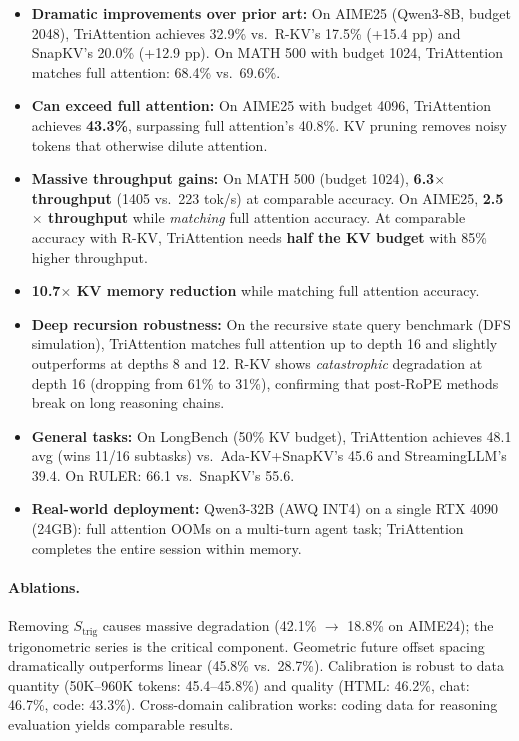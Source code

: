 \documentclass[11pt]{article}
\begin{document}
\begin{itemize}
    \item \textbf{Dramatic improvements over prior art:} On AIME25 (Qwen3-8B, budget 2048), TriAttention achieves 32.9\% vs.\ R-KV's 17.5\% (+15.4 pp) and SnapKV's 20.0\% (+12.9 pp). On MATH 500 with budget 1024, TriAttention matches full attention: 68.4\% vs.\ 69.6\%.

    \item \textbf{Can exceed full attention:} On AIME25 with budget 4096, TriAttention achieves \textbf{43.3\%}, surpassing full attention's 40.8\%. KV pruning removes noisy tokens that otherwise dilute attention.

    \item \textbf{Massive throughput gains:} On MATH 500 (budget 1024), \textbf{6.3$\times$ throughput} (1405 vs.\ 223 tok/s) at comparable accuracy. On AIME25, \textbf{2.5$\times$ throughput} while \textit{matching} full attention accuracy. At comparable accuracy with R-KV, TriAttention needs \textbf{half the KV budget} with 85\% higher throughput.

    \item \textbf{10.7$\times$ KV memory reduction} while matching full attention accuracy.

    \item \textbf{Deep recursion robustness:} On the recursive state query benchmark (DFS simulation), TriAttention matches full attention up to depth 16 and slightly outperforms at depths 8 and 12. R-KV shows \textit{catastrophic} degradation at depth 16 (dropping from 61\% to 31\%), confirming that post-RoPE methods break on long reasoning chains.

    \item \textbf{General tasks:} On LongBench (50\% KV budget), TriAttention achieves 48.1 avg (wins 11/16 subtasks) vs.\ Ada-KV+SnapKV's 45.6 and StreamingLLM's 39.4. On RULER: 66.1 vs.\ SnapKV's 55.6.

    \item \textbf{Real-world deployment:} Qwen3-32B (AWQ INT4) on a single RTX 4090 (24GB): full attention OOMs on a multi-turn agent task; TriAttention completes the entire session within memory.
\end{itemize}

\paragraph{Ablations.}
Removing $S_{\mathrm{trig}}$ causes massive degradation (42.1\% $\to$ 18.8\% on AIME24); the trigonometric series is the critical component. Geometric future offset spacing dramatically outperforms linear (45.8\% vs.\ 28.7\%). Calibration is robust to data quantity (50K--960K tokens: 45.4--45.8\%) and quality (HTML: 46.2\%, chat: 46.7\%, code: 43.3\%). Cross-domain calibration works: coding data for reasoning evaluation yields comparable results.
\end{document}
